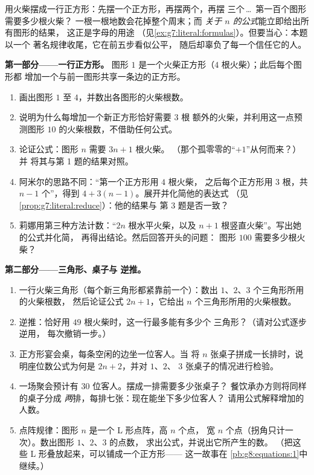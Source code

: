 \begin{problem}
\label{pb:g7:literal:1}
用火柴摆成一行正方形：先摆一个正方形，再摆两个，再摆
三个\,\dots\ 第一百个图形需要多少根火柴？
一根一根地数会花掉整个周末；而\emph{
关于 $n$ 的公式}能立即给出所有图形的结果，
这正是字母的用途
（见\cref{ex:g7:literal:formulas}）。但要当心：本题以一个
著名规律收尾，它在前五步看似公平，
随后却辜负了每一个信任它的人。

\medskip
\noindent\textbf{第一部分——一行正方形。}
图形 $1$ 是一个火柴正方形（$4$ 根火柴）；此后每个图形都
增加一个与前一图形共享一条边的正方形。
\begin{enumerate}
  \item 画出图形 $1$ 至 $4$，并数出各图形的火柴根数。
  \item 说明为什么每增加一个新正方形恰好需要 $3$ 根
        额外的火柴，并利用这一点预测图形
        $10$ 的火柴根数，不借助任何公式。
  \item 论证公式：图形 $n$ 需要 $3n + 1$ 根火柴。
        （那个孤零零的“$+1$”从何而来？）并
        将其与第 1 题的结果对照。
  \item 阿米尔的思路不同：“第一个正方形用 $4$ 根火柴，
        之后每个正方形用 $3$ 根，共 $n - 1$ 个”，得到
        $4 + 3(n - 1)$。展开并化简他的表达式
        （见\cref{prop:g7:literal:reduce}）：他的结果与
        第 3 题是否一致？
  \item 莉娜用第三种方法计数：“$2n$ 根水平火柴，以及
        $n + 1$ 根竖直火柴”。写出她的公式并化简，
        再得出结论。然后回答开头的问题：
        图形 $100$ 需要多少根火柴？
\end{enumerate}

\medskip
\noindent\textbf{第二部分——三角形、桌子与
逆推。}
\begin{enumerate}[resume]
  \item 一行火柴三角形（每个新三角形都紧靠前一个）：数出
        $1$、$2$、$3$ 个三角形所用的火柴根数，
        然后论证公式 $2n + 1$，它给出
        $n$ 个三角形所用的火柴根数。
  \item 逆推：恰好用 $49$ 根火柴时，这一行最多能有多少个
        三角形？（请对公式逐步逆用，
        每次撤销一步。）
  \item 正方形宴会桌，每条空闲的边坐一位客人。当
        将 $n$ 张桌子拼成一长排时，说明座位数公式为何是
        $2n + 2$，并对 $1$、$2$、
        $3$ 张桌子的情况进行检验。
  \item 一场聚会预计有 $30$ 位客人。摆成一排需要多少张桌子？
        餐饮承办方则将同样的桌子分成
        \emph{两}排，每排七张：现在能坐下多少位客人？
        请用公式解释增加的人数。
  \item 点阵规律：图形 $n$ 是一个 L 形点阵，高 $n$ 个点，
        宽 $n$ 个点（拐角只计一次）。数出图形 $1$、$2$、$3$ 的点数，
        求出公式，并说出它所产生的数。
        （把这些 L 形叠放起来，可以铺成一个正方形——
        这一故事在
        \cref{pb:g8:equations:1}中继续。）
\end{enumerate}


\end{problem}
